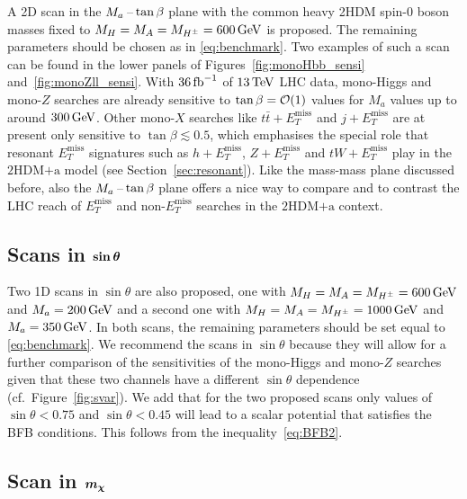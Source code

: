 \documentclass[a4paper, 11pt,notoc]{article}
\newcommand{\MET}{\ensuremath{E_T^\mathrm{miss}}\xspace}
\newcommand{\mA}{\ensuremath{M_{A}}\xspace}
\newcommand{\ma}{\ensuremath{M_{a}}\xspace}
\newcommand{\mH}{\ensuremath{M_{H}}\xspace}
\newcommand{\mHc}{\ensuremath{M_{H^{\pm}}}\xspace}
\newcommand{\hdma}{\ensuremath{\textrm{2HDM+a}}\xspace}
\def\bm#1{\mbox{\boldmath$#1$\unboldmath}}
\begin{document}
A 2D scan in the  $\ma\hspace{0.5mm}$--$\hspace{0.5mm} \tan \beta$ plane with  the common heavy 2HDM  spin-0 boson  masses fixed to $\mH = \mA = \mHc = 600 \, {\rm GeV}$ is proposed.  The remaining parameters should be chosen as in \eqref{eq:benchmark}. Two examples of such a scan can be found in the lower panels of Figures~\ref{fig:monoHbb_sensi} and~\ref{fig:monoZll_sensi}. With $36 \, {\rm fb}^{-1}$ of $13 \, {\rm TeV}$ LHC data, mono-Higgs and mono-$Z$ searches are already sensitive to $\tan \beta = {\cal O} (1)$ values for $M_a$ values up to around $300 \, {\rm GeV}$. Other mono-$X$ searches like $t \bar t +\MET$ and $j + \MET$ are at present only sensitive to $\tan \beta \lesssim 0.5$, which emphasises the special role that  resonant $\MET$ signatures such as $h + \MET$, $Z + \MET$ and $tW + \MET$ play in the \hdma model (see Section~\ref{sec:resonant}). Like  the mass-mass plane discussed before, also the $\ma\hspace{0.5mm}$--$\hspace{0.5mm} \tan \beta$ plane offers a nice way to compare and to contrast the LHC reach of $\MET$ and non-$\MET$ searches in the \hdma context. 

\subsection{Scans in $\bm{\sin \theta}$}

Two 1D  scans in $\sin \theta$ are also proposed, one with $\mH = \mA = \mHc = 600 \, {\rm GeV}$ and $\ma = 200 \, {\rm GeV}$ and a second one with $\mH = \mA = \mHc = 1000 \, {\rm GeV}$ and $\ma = 350 \, {\rm GeV}$. In both scans, the remaining parameters should be set equal to \eqref{eq:benchmark}.  We recommend the scans in $\sin \theta$ because they will  allow for a further comparison of the sensitivities of the mono-Higgs and mono-$Z$ searches given that these two channels have a different $\sin \theta$ dependence (cf.~Figure~\ref{fig:svar}).  We add that for the two proposed scans only values of $\sin \theta < 0.75$ and $\sin \theta < 0.45$ will lead to a scalar potential that satisfies the BFB conditions. This follows from the inequality~\eqref{eq:BFB2}.

\subsection{Scan in $\bm{m_\chi}$}
\end{document}
